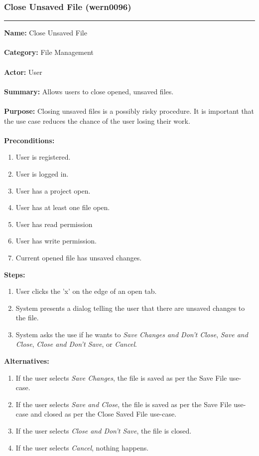 \documentclass[11pt]{report}
\begin{document}
\subsubsection{Close Unsaved File (wern0096)}
\vspace{2pt}
\hrule
\vspace{8pt}
	\noindent\textbf{Name:} Close Unsaved File \\ \\
	\textbf{Category:} File Management \\ \\
	\textbf{Actor:} User \\ \\
	\textbf{Summary:} Allows users to close opened, unsaved files. \\ \\
	\textbf{Purpose:} Closing unsaved files is a possibly risky procedure. It is important that the use case reduces the chance of the user losing their work. \\ \\
	\textbf{Preconditions:} 
	\begin{enumerate}
		\item User is registered.
		\item User is logged in.
		\item User has a project open.
		\item User has at least one file open.
		\item User has read permission
		\item User has write permission.
		\item Current opened file has unsaved changes.
	\end{enumerate}		
	\textbf{Steps:}
	\begin{enumerate}
		\item User clicks the 'x' on the edge of an open tab.
		\item System presents a dialog telling the user that there are unsaved changes to the file.
		\item System asks the use if he wants to \textit{Save Changes and Don't Close}, \textit{Save and Close}, \textit{Close and Don't Save}, or \textit{Cancel}.
	\end{enumerate}	
	\textbf{Alternatives:}
	\begin{enumerate}
		\item If the user selects \textit{Save Changes}, the file is saved as per the Save File use-case.
		\item If the user selects \textit{Save and Close}, the file is saved as per the Save File use-case and closed as per the Close Saved File use-case.
		\item If the user selects \textit{Close and Don't Save}, the file is closed.
		\item If the user selects \textit{Cancel}, nothing happens.
	\end{enumerate}
\end{document}

